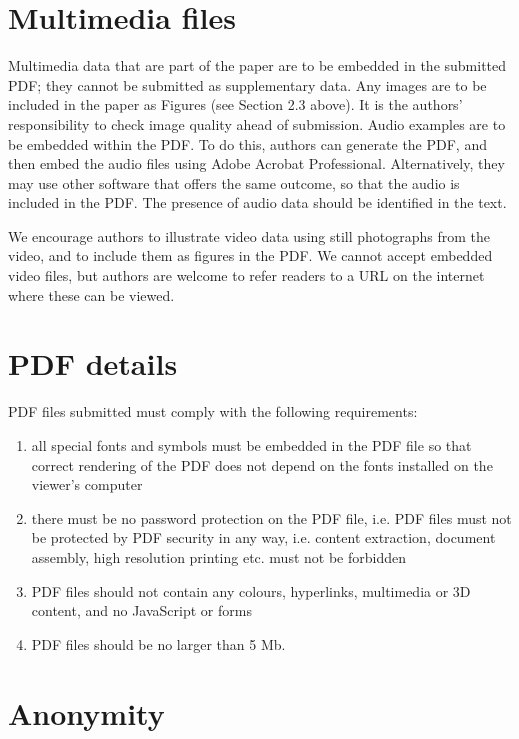 \documentclass[a4paper,11pt,twocolumn]{article}
\begin{document}
\section{Multimedia files}

Multimedia data that are part of the paper are to be embedded in the
submitted PDF; they cannot be submitted as supplementary data. Any
images are to be included in the paper as Figures (see Section 2.3
above). It is the authors' responsibility to check image quality ahead
of submission. Audio examples are to be embedded within the PDF. To do
this, authors can generate the PDF, and then embed the audio files using
Adobe Acrobat Professional. Alternatively, they may use other software
that offers the same outcome, so that the audio is included in the PDF.
The presence of audio data should be identified in the text.

We encourage authors to illustrate video data using still photographs
from the video, and to include them as figures in the PDF. We cannot
accept embedded video files, but authors are welcome to refer readers to
a URL on the internet where these can be viewed.

\section{PDF details}

PDF files submitted must comply with the following requirements:

\begin{enumerate}
  \item all special fonts and symbols must be embedded in the PDF file so 
  that correct rendering of the PDF does not depend on the fonts installed 
  on the viewer's computer
  \item there must be no password protection on the PDF file, i.e. PDF files 
  must not be protected by PDF security in any way, i.e. content extraction, 
  document assembly, high resolution printing etc. must not be forbidden
  \item PDF files should not contain any colours, hyperlinks, multimedia or 
  3D content, and no JavaScript or forms
  \item PDF files should be no larger than 5 Mb.
\end{enumerate}

\section{Anonymity}
\end{document}
